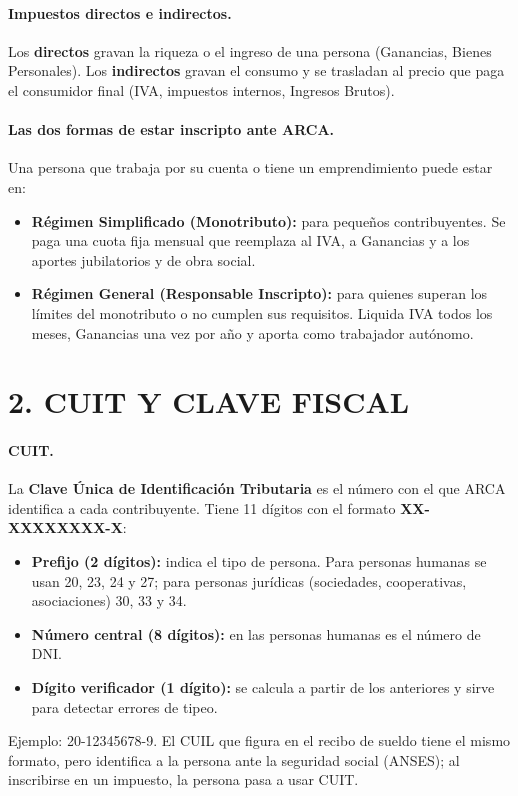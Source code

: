 \paragraph*{Impuestos directos e indirectos.}
Los \textbf{directos} gravan la riqueza o el ingreso de una persona (Ganancias, Bienes
Personales). Los \textbf{indirectos} gravan el consumo y se trasladan al precio que paga el
consumidor final (IVA, impuestos internos, Ingresos Brutos).

\paragraph*{Las dos formas de estar inscripto ante ARCA.}
Una persona que trabaja por su cuenta o tiene un emprendimiento puede estar en:
\begin{itemize}
  \item \textbf{Régimen Simplificado (Monotributo):} para pequeños contribuyentes. Se paga
        una cuota fija mensual que reemplaza al IVA, a Ganancias y a los aportes jubilatorios
        y de obra social.
  \item \textbf{Régimen General (Responsable Inscripto):} para quienes superan los límites
        del monotributo o no cumplen sus requisitos. Liquida IVA todos los meses, Ganancias
        una vez por año y aporta como trabajador autónomo.
\end{itemize}

\section*{2. CUIT Y CLAVE FISCAL}

\paragraph*{CUIT.}
La \textbf{Clave Única de Identificación Tributaria} es el número con el que ARCA identifica
a cada contribuyente. Tiene 11 dígitos con el formato \textbf{XX-XXXXXXXX-X}:
\begin{itemize}
  \item \textbf{Prefijo (2 dígitos):} indica el tipo de persona. Para personas humanas se usan
        20, 23, 24 y 27; para personas jurídicas (sociedades, cooperativas, asociaciones)
        30, 33 y 34.
  \item \textbf{Número central (8 dígitos):} en las personas humanas es el número de DNI.
  \item \textbf{Dígito verificador (1 dígito):} se calcula a partir de los anteriores y sirve
        para detectar errores de tipeo.
\end{itemize}
Ejemplo: 20-12345678-9. El CUIL que figura en el recibo de sueldo tiene el mismo formato,
pero identifica a la persona ante la seguridad social (ANSES); al inscribirse en un impuesto,
la persona pasa a usar CUIT.

